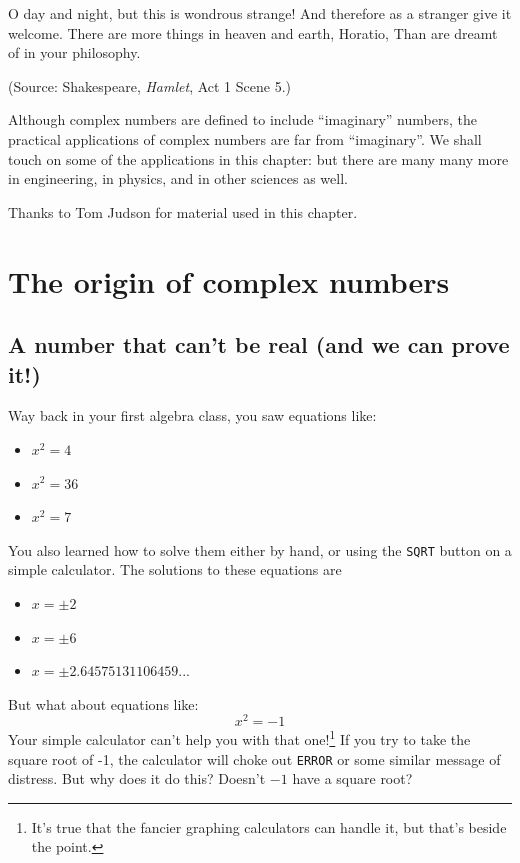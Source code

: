 

\begin{dialogue}
 O day and night, but this is wondrous strange!
 And therefore as a stranger give it welcome.
There are more things in heaven and earth, Horatio,
Than are dreamt of in your philosophy.
\noindent
\end{dialogue}
(Source: Shakespeare, \emph{Hamlet}, Act 1 Scene 5.)
\bigskip

Although complex numbers are defined to include ``imaginary'' numbers, the practical applications of complex numbers are far from ``imaginary''.  We shall touch on some of the applications in this chapter: but there are many many more in engineering, in physics, and in other sciences as well.
\medskip

Thanks to Tom Judson for material used in this chapter.

\section{The origin of complex numbers}\label{origin_complex}

\subsection{A number that can't be real (and we can prove it!)}

Way back in your first algebra class, you saw equations like:
\begin{itemize}
\item $x^2 = 4$
\item $x^2 = 36$
\item $x^2 = 7$

\end{itemize}
You also learned how to solve them either by hand, or using the \texttt{SQRT} button on a simple calculator. The solutions to these equations are
\begin{itemize}
\item $x = \pm 2$
\item $x = \pm 6$
\item $x = \pm 2.64575131106459...$
\end{itemize}
 But what about equations like:
\[x^2 = -1 \]
Your simple calculator can't help you with that one!\footnote{It's true that the fancier graphing calculators can handle it, but that's beside the point.}  If you try to take the square root of -1, the calculator will choke out \texttt{ERROR} or some similar message of distress.  But why does it do this? Doesn't $-1$ have a square root? 

